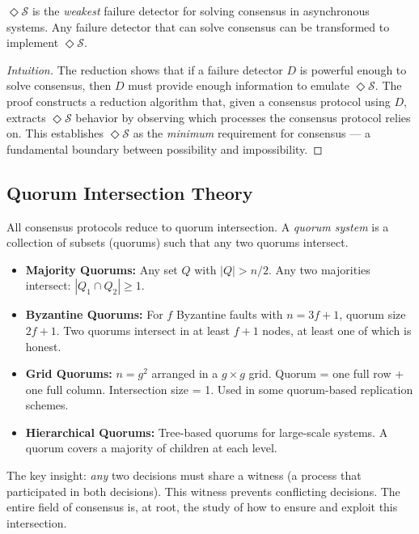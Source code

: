 \begin{theorem}
$\Diamond \mathcal{S}$ is the \emph{weakest} failure detector for solving consensus in asynchronous systems. Any failure detector that can solve consensus can be transformed to implement $\Diamond \mathcal{S}$.
\end{theorem}

\begin{proof}[Intuition]
The reduction shows that if a failure detector $D$ is powerful enough to solve consensus, then $D$ must provide enough information to emulate $\Diamond \mathcal{S}$. The proof constructs a reduction algorithm that, given a consensus protocol using $D$, extracts $\Diamond \mathcal{S}$ behavior by observing which processes the consensus protocol relies on. This establishes $\Diamond \mathcal{S}$ as the \emph{minimum} requirement for consensus — a fundamental boundary between possibility and impossibility.
\end{proof}

\subsection{Quorum Intersection Theory}
\label{sec:consensus:quorums}

All consensus protocols reduce to quorum intersection. A \emph{quorum system} is a collection of subsets (quorums) such that any two quorums intersect.

\begin{itemize}
\item \textbf{Majority Quorums:} Any set $Q$ with $|Q| > n/2$. Any two majorities intersect: $|Q_1 \cap Q_2| \ge 1$.
\item \textbf{Byzantine Quorums:} For $f$ Byzantine faults with $n = 3f+1$, quorum size $2f+1$. Two quorums intersect in at least $f+1$ nodes, at least one of which is honest.
\item \textbf{Grid Quorums:} $n = g^2$ arranged in a $g \times g$ grid. Quorum = one full row + one full column. Intersection size = 1. Used in some quorum-based replication schemes.
\item \textbf{Hierarchical Quorums:} Tree-based quorums for large-scale systems. A quorum covers a majority of children at each level.
\end{itemize}

The key insight: \emph{any} two decisions must share a witness (a process that participated in both decisions). This witness prevents conflicting decisions. The entire field of consensus is, at root, the study of how to ensure and exploit this intersection.

